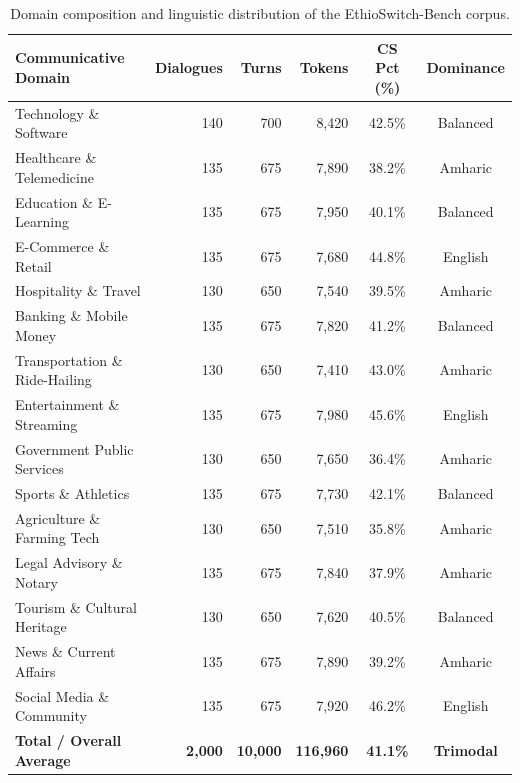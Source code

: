 \documentclass[11pt,a4paper]{article}
\begin{document}
\begin{table}[htbp]
\centering
\small
\caption{Domain composition and linguistic distribution of the EthioSwitch-Bench corpus.}
\label{tab:corpus_comp}
\begin{tabular}{lrrrcc}
\toprule
\textbf{Communicative Domain} & \textbf{Dialogues} & \textbf{Turns} & \textbf{Tokens} & \textbf{CS Pct (\%)} & \textbf{Dominance} \\
\midrule
Technology \& Software & 140 & 700 & 8,420 & 42.5\% & Balanced \\
Healthcare \& Telemedicine & 135 & 675 & 7,890 & 38.2\% & Amharic \\
Education \& E-Learning & 135 & 675 & 7,950 & 40.1\% & Balanced \\
E-Commerce \& Retail & 135 & 675 & 7,680 & 44.8\% & English \\
Hospitality \& Travel & 130 & 650 & 7,540 & 39.5\% & Amharic \\
Banking \& Mobile Money & 135 & 675 & 7,820 & 41.2\% & Balanced \\
Transportation \& Ride-Hailing & 130 & 650 & 7,410 & 43.0\% & Amharic \\
Entertainment \& Streaming & 135 & 675 & 7,980 & 45.6\% & English \\
Government Public Services & 130 & 650 & 7,650 & 36.4\% & Amharic \\
Sports \& Athletics & 135 & 675 & 7,730 & 42.1\% & Balanced \\
Agriculture \& Farming Tech & 130 & 650 & 7,510 & 35.8\% & Amharic \\
Legal Advisory \& Notary & 135 & 675 & 7,840 & 37.9\% & Amharic \\
Tourism \& Cultural Heritage & 130 & 650 & 7,620 & 40.5\% & Balanced \\
News \& Current Affairs & 135 & 675 & 7,890 & 39.2\% & Amharic \\
Social Media \& Community & 135 & 675 & 7,920 & 46.2\% & English \\
\midrule
\textbf{Total / Overall Average} & \textbf{2,000} & \textbf{10,000} & \textbf{116,960} & \textbf{41.1\%} & \textbf{Trimodal} \\
\bottomrule
\end{tabular}
\end{table}
\end{document}
